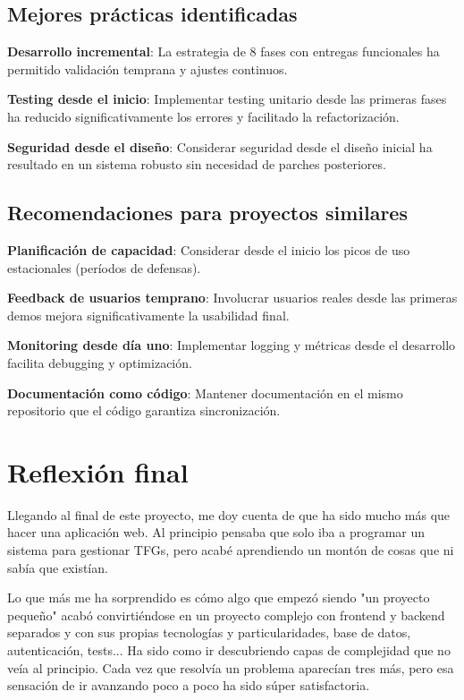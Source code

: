 \documentclass[12pt,a4paper,oneside]{report}
\begin{document}
\subsection{Mejores prácticas
identificadas}\label{mejores-pruxe1cticas-identificadas}

\textbf{Desarrollo incremental}: La estrategia de 8 fases con entregas
funcionales ha permitido validación temprana y ajustes continuos.

\textbf{Testing desde el inicio}: Implementar testing unitario desde las
primeras fases ha reducido significativamente los errores y facilitado
la refactorización.

\textbf{Seguridad desde el diseño}: Considerar seguridad desde el diseño
inicial ha resultado en un sistema robusto sin necesidad de parches
posteriores.

\subsection{Recomendaciones para proyectos
similares}\label{recomendaciones-para-proyectos-similares}

\textbf{Planificación de capacidad}: Considerar desde el inicio los
picos de uso estacionales (períodos de defensas).

\textbf{Feedback de usuarios temprano}: Involucrar usuarios reales desde
las primeras demos mejora significativamente la usabilidad final.

\textbf{Monitoring desde día uno}: Implementar logging y métricas desde
el desarrollo facilita debugging y optimización.

\textbf{Documentación como código}: Mantener documentación en el mismo
repositorio que el código garantiza sincronización.

\section{Reflexión final}\label{reflexiuxf3n-final}

Llegando al final de este proyecto, me doy cuenta de que ha sido mucho más que hacer una aplicación web. Al principio pensaba que solo iba a programar un sistema para gestionar TFGs, pero acabé aprendiendo un montón de cosas que ni sabía que existían.

Lo que más me ha sorprendido es cómo algo que empezó siendo "un proyecto pequeño" acabó convirtiéndose en un proyecto complejo con frontend y backend separados y con sus propias tecnologías y particularidades, base de datos, autenticación, tests... Ha sido como ir descubriendo capas de complejidad que no veía al principio. Cada vez que resolvía un problema aparecían tres más, pero esa sensación de ir avanzando poco a poco ha sido súper satisfactoria.
\end{document}
